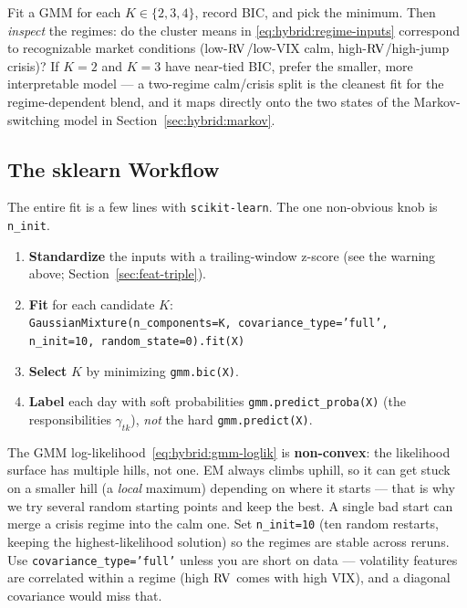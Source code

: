 \begin{projectconnection}
Fit a GMM for each $K \in \{2,3,4\}$, record BIC, and pick the minimum.
Then \emph{inspect} the regimes: do the cluster means in
\eqref{eq:hybrid:regime-inputs} correspond to recognizable market
conditions (low-$\operatorname{RV}$/low-VIX calm, high-$\operatorname{RV}$/high-jump crisis)?  If $K=2$
and $K=3$ have near-tied BIC, prefer the smaller, more interpretable model
--- a two-regime calm/crisis split is the cleanest fit for the
regime-dependent blend, and it maps directly onto the two states of the
Markov-switching model in Section~\ref{sec:hybrid:markov}.
\end{projectconnection}

\subsection{The sklearn Workflow}
\label{sec:hybrid:sklearn-gmm}

The entire fit is a few lines with \texttt{scikit-learn}.  The one
non-obvious knob is \texttt{n\_init}.

\begin{keyidea}
\begin{enumerate}
  \item \textbf{Standardize} the inputs with a trailing-window z-score
        (see the warning above; Section~\ref{sec:feat-triple}).
  \item \textbf{Fit} for each candidate $K$:\\
        \texttt{GaussianMixture(n\_components=K, covariance\_type='full',\\
        \hspace*{2em}n\_init=10, random\_state=0).fit(X)}
  \item \textbf{Select} $K$ by minimizing \texttt{gmm.bic(X)}.
  \item \textbf{Label} each day with soft probabilities
        \texttt{gmm.predict\_proba(X)} (the responsibilities
        $\gamma_{tk}$), \emph{not} the hard \texttt{gmm.predict(X)}.
\end{enumerate}
\end{keyidea}

\begin{warning}
The GMM log-likelihood~\eqref{eq:hybrid:gmm-loglik} is \textbf{non-convex}:
the likelihood surface has multiple hills, not one.  EM always climbs
uphill, so it can get stuck on a smaller hill (a \emph{local} maximum)
depending on where it starts --- that is why we try several random starting
points and keep the best.  A single bad start can merge a crisis regime
into the calm one.  Set \texttt{n\_init=10} (ten random restarts, keeping the
highest-likelihood solution) so the regimes are stable across reruns.  Use
\texttt{covariance\_type='full'} unless you are short on data --- volatility
features are correlated within a regime (high $\operatorname{RV}$ comes with high VIX),
and a diagonal covariance would miss that.
\end{warning}

